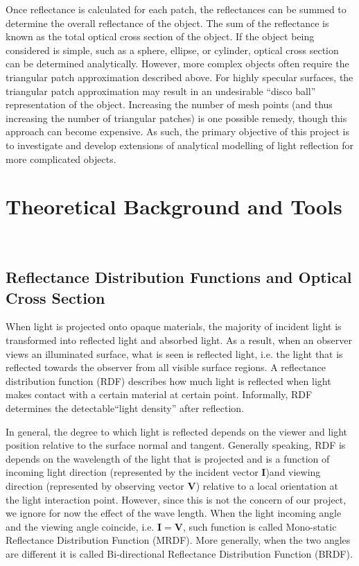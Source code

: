 \documentclass[11pt,reqno]{amsart}
\theoremstyle{definition}
\begin{document}
Once reflectance is calculated for each patch, the reflectances can be summed
to determine the overall reflectance of the object.  The sum of the reflectance
is known as the total optical cross section of the object.  If the object being
considered is simple, such as a sphere, ellipse, or cylinder, optical cross
section can be determined analytically.  However, more complex objects often
require the triangular patch approximation described above.  For highly
specular surfaces, the triangular patch approximation may result in an
undesirable ``disco ball'' representation of the object.  Increasing the number
of mesh points (and thus increasing the number of triangular patches) is one
possible remedy, though this approach can become expensive.  As
such, the primary objective of this project is to investigate and develop
extensions of analytical modelling of light reflection for more complicated
objects. 

\section{Theoretical Background and Tools}~\\
\subsection{Reflectance Distribution Functions and Optical Cross Section}
When light is projected onto opaque materials, the majority of incident light
is transformed into reflected light and absorbed light. As a result, when an
observer views an illuminated surface, what is seen is reflected light, i.e.
the light that is reflected towards the observer from all visible surface
regions. A reflectance distribution function (RDF) describes how much light is
reflected when light makes contact with a certain material at certain point. 
Informally, RDF determines the detectable``light density'' after
reflection. 

In general, the degree to which light is reflected depends on the viewer and
light position relative to the surface normal and tangent. Generally speaking,
RDF is depends on the wavelength of the light that is projected and is a
function of incoming light direction (represented by the incident vector
\textbf{I})and viewing direction (represented by observing vector \textbf{V})
relative to a local orientation at the light interaction point. However, since
this is not the concern of our project, we ignore for now the effect of the
wave length. When the light incoming angle and the viewing angle coincide, i.e.
$\mathbf{I}=\mathbf{V}$, such function is called Mono-static Reflectance
Distribution Function (MRDF). More generally, when the two angles are different
it is called Bi-directional Reflectance Distribution Function (BRDF). 
\end{document}
